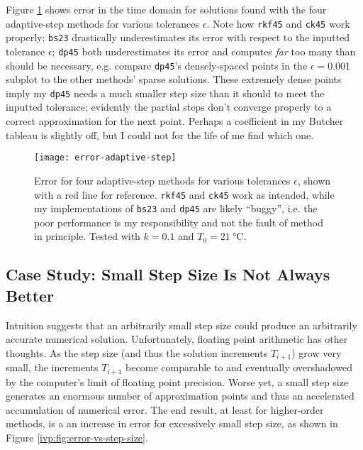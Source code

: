 \documentclass[11pt, a4paper]{article}
\begin{document}
Figure \ref{ivp:fig:error-adaptive-step} shows error in the time domain for solutions found with the four adaptive-step methods for various tolerances $ \epsilon $. Note how \texttt{rkf45} and \texttt{ck45} work properly; \texttt{bs23} drastically underestimates its error with respect to the inputted tolerance $ \epsilon $; \texttt{dp45} both underestimates its error and computes \textit{far} too many than should be necessary, e.g. compare \texttt{dp45}'s densely-spaced points in the $ \epsilon = 0.001 $ subplot to the other methods' sparse solutions. These extremely dense points imply my \texttt{dp45} needs a much smaller step size than it should to meet the inputted tolerance; evidently the partial steps don't converge properly to a correct approximation for the next point. Perhaps a coefficient in my Butcher tableau is slightly off, but I could not for the life of me find which one.

\begin{figure}
\centering
\texttt{[image: error-adaptive-step]}

\caption{Error for four adaptive-step methods for various tolerances $ \epsilon $, shown with a red line for reference. \texttt{rkf45} and \texttt{ck45} work as intended, while my implementations of \texttt{bs23} and \texttt{dp45} are likely ``buggy'', i.e. the poor performance is my responsibility and not the fault of method in principle. Tested with $ k = 0.1 $ and $ T_{0} = \SI{21}{\degreeCelsius} $.} 

\label{ivp:fig:error-adaptive-step}

\end{figure} 


\subsection{Case Study: Small Step Size Is Not Always Better}
Intuition suggests that an arbitrarily small step size could produce an arbitrarily accurate numerical solution. Unfortunately, floating point arithmetic has other thoughts. As the step size (and thus the solution increments $ T_{i+1} $) grow very small, the increments $ T_{i+1} $ become comparable to and eventually overshadowed by the computer's limit of floating point precision. Worse yet, a small step size generates an enormous number of approximation points and thus an accelerated accumulation of numerical error. The end result, at least for higher-order methods, is a an increase in error for excessively small step size, as shown in Figure \ref{ivp:fig:error-vs-step-size}.
\end{document}
